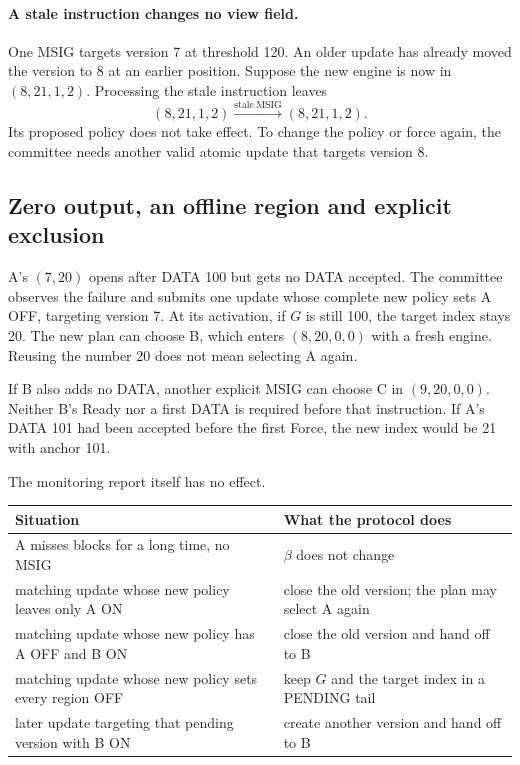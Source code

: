 \documentclass[11pt,a4paper]{article}
\newcounter{protocol}
\begin{document}
\paragraph{A stale instruction changes no view field.}
One MSIG targets version 7 at threshold 120. An older update has already
moved the version to 8 at an earlier position. Suppose the new
engine is now in $(8,21,1,2)$. Processing the stale instruction leaves
\[
 (8,21,1,2)\xrightarrow{\mathrm{stale\ MSIG}}(8,21,1,2).
\]
Its proposed policy does not take effect. To change the policy or force again,
the committee needs another valid atomic update that targets version 8.

\subsection{Zero output, an offline region and explicit exclusion}
\label{sec:retry-example}
A's $(7,20)$ opens after DATA 100 but gets no DATA accepted. The committee
observes the failure and submits one update whose complete new policy
sets A OFF, targeting version 7. At its activation, if
$G$ is still 100, the target index stays 20. The new plan can choose B, which
enters $(8,20,0,0)$ with a fresh engine. Reusing the number 20 does not
mean selecting A again.

If B also adds no DATA, another explicit MSIG can choose C in
$(9,20,0,0)$. Neither B's Ready nor a first DATA is required before that
instruction. If A's DATA 101 had been accepted before the first Force,
the new index would be 21 with anchor 101.

The monitoring report itself has no effect.
\begin{center}\small
\begin{tabularx}{\linewidth}{@{}>{\raggedright\arraybackslash}p{.45\linewidth}Y@{}}\toprule
Situation & What the protocol does\\\midrule
A misses blocks for a long time, no MSIG & $\beta$ does not change\\
matching update whose new policy leaves only A ON & close the old version; the plan may select A again\\
matching update whose new policy has A OFF and B ON & close the old version and hand off to B\\
matching update whose new policy sets every region OFF & keep $G$ and the target index in a PENDING tail\\
later update targeting that pending version with B ON & create another version and hand off to B\\\bottomrule
\end{tabularx}
\end{center}
\end{document}
